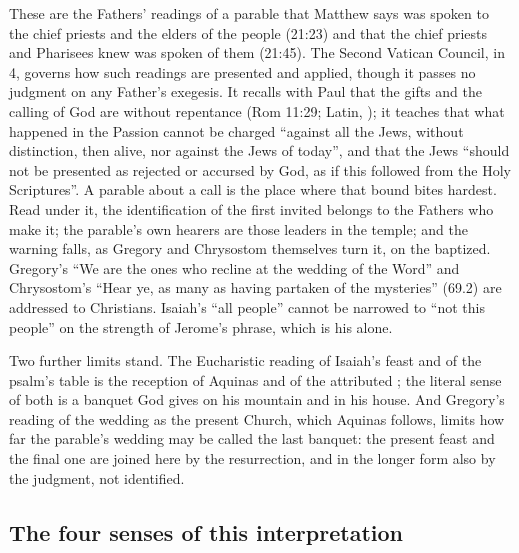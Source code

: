 These are the Fathers' readings of a parable that Matthew says was spoken to
the chief priests and the elders of the people (21:23) and that the chief
priests and Pharisees knew was spoken of them (21:45). The Second Vatican
Council, in  4, governs how such readings are presented and
applied, though it passes no judgment on any Father's exegesis. It recalls
with Paul that the gifts and the calling of God are without repentance
(Rom 11:29; Latin, ); it
teaches that what happened in the Passion cannot be charged ``against all the
Jews, without distinction, then alive, nor against the Jews of today'', and
that the Jews ``should not be presented as rejected or accursed by God, as if
this followed from the Holy Scriptures''. A parable about a call is the place
where that bound bites hardest. Read under it, the identification of the
first invited belongs to the Fathers who make it; the parable's own hearers
are those leaders in the temple; and the warning falls, as Gregory and
Chrysostom themselves turn it, on the baptized. Gregory's ``We are the ones
who recline at the wedding of the Word'' and Chrysostom's ``Hear ye, as many as
having partaken of the mysteries'' (69.2) are addressed to Christians. Isaiah's
``all people'' cannot be narrowed to ``not this people'' on the strength of
Jerome's phrase, which is his alone.

Two further limits stand. The Eucharistic reading of Isaiah's feast and of the
psalm's table is the reception of Aquinas and of the attributed
; the literal sense of both is a banquet God gives on his
mountain and in his house. And Gregory's reading of the wedding as the present
Church, which Aquinas follows, limits how far the parable's wedding may be
called the last banquet: the present feast and the final one are joined here
by the resurrection, and in the longer form also by the judgment, not
identified.

\subsection{The four senses of this interpretation}

